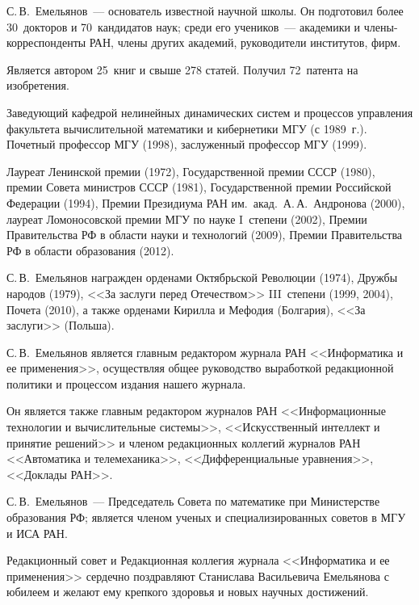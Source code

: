 \begin{multicols}{2}
     С.\,В.~Емельянов~--- основатель известной научной школы. Он подготовил более 30~докторов и 70~кандидатов
наук; среди его учеников~--- академики и чле\-ны-кор\-рес\-пон\-ден\-ты РАН, члены других академий, руководители институтов, фирм.

     Является автором 25~книг и свыше 278 статей. Получил 72~патента на изобретения.

     Заведующий кафедрой нелинейных динамических систем и процессов управления факультета вычислительной
математики и кибернетики МГУ (с 1989~г.). Почетный профессор МГУ (1998), заслуженный профессор МГУ (1999).

     Лауреат Ленинской премии (1972), Государственной премии СССР (1980), премии Совета министров СССР (1981),
Государственной премии Российской Федерации (1994), Премии Президиума РАН им.\ акад.\ А.\,А.~Андронова (2000),
лауреат Ломоносовской премии МГУ по науке I~степени (2002), Премии Правительства РФ в области науки и технологий
(2009), Премии Правительства РФ в области образования (2012).


     С.\,В.~Емельянов награжден орденами Октябрьской Революции (1974), Дружбы народов (1979),
<<За заслуги перед
Отечеством>> III~степени (1999, 2004), Почета (2010), а также орденами Кирилла и Мефодия (Болгария), <<За заслуги>>
(Польша).

     С.\,В.~Емельянов является главным редактором журнала РАН <<Информатика и ее применения>>, осуществляя
общее руководство выработкой редакционной политики и процессом издания нашего журнала.

     Он является также главным редактором журналов РАН <<Информационные технологии и вы\-чис\-ли\-тель\-ные
системы>>, <<Искусственный интеллект и принятие решений>> и членом редакционных коллегий журналов РАН
<<Автоматика и телемеханика>>, <<Дифференциальные уравнения>>, <<Доклады РАН>>.

     С.\,В.~Емельянов~--- Председатель Совета по математике при Министерстве образования РФ; является членом
ученых и специализированных советов в МГУ и ИСА РАН.

     \bigskip

     Редакционный совет и Редакционная коллегия журнала <<Информатика и ее применения>> сердечно поздравляют
Станислава Васильевича Емельянова с юбилеем и желают ему крепкого здоровья и новых научных достижений.




\end{multicols}


